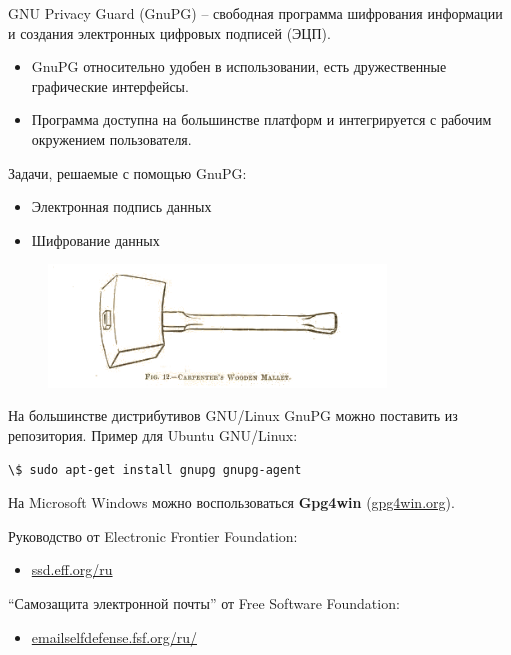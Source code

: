 \documentclass[presentation]{beamer}
\newcommand{\RaisedRightHand}{%
  \raisebox{-.50em}{\Large\HandRight}
}
\begin{document}
\begin{frame}{}
  \RaisedRightHand GNU Privacy Guard
  (GnuPG) -- свободная программа шифрования информации и создания
  электронных цифровых подписей (ЭЦП).

  \begin{itemize}
  \item GnuPG относительно удобен в использовании, есть дружественные
    графические интерфейсы.
  \item Программа доступна на большинстве платформ и интегрируется с
    рабочим окружением пользователя.
  \end{itemize}

  Задачи, решаемые с помощью GnuPG:
  \begin{itemize}
  \item Электронная подпись данных
  \item Шифрование данных
  \end{itemize}
  \begin{figure}[htb]
    \centering
    \includegraphics[width=0.8\textwidth]{hammer-03}
  \end{figure}
\end{frame}

\begin{frame}[fragile]{}
  На большинстве дистрибутивов GNU/Linux GnuPG можно поставить из
  репозитория.  Пример для Ubuntu GNU/Linux:
\begin{Verbatim}[commandchars=\\\[\]]
\$ sudo apt-get install gnupg gnupg-agent
\end{Verbatim}
\vspace{5 mm}

На Microsoft Windows можно воспользоваться \textbf{Gpg4win}
(\url{gpg4win.org}).\newline

\RaisedRightHand Руководство от Electronic Frontier Foundation:
\begin{itemize}
\item \url{ssd.eff.org/ru}
\end{itemize}
\RaisedRightHand ``Самозащита электронной почты'' от Free Software
Foundation:
\begin{itemize}
\item \url{emailselfdefense.fsf.org/ru/}
\end{itemize}
\end{frame}
\end{document}

